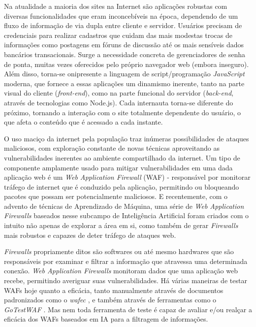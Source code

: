 Na atualidade a maioria dos sites na Internet são aplicações robustas com diversas funcionalidades que eram inconcebíveis na época, dependendo de um fluxo de informação de via dupla entre cliente e servidor. Usuários precisam de credenciais para realizar cadastros que cuidam das mais modestas trocas de informações como postagens em fóruns de discussão até os mais sensíveis dados bancários transacionais. Surge a necessidade concreta de gerenciadores de senha de ponta, muitas vezes oferecidos pelo próprio navegador web (embora inseguro). Além disso, torna-se onipresente a linguagem de script/programação \textit{JavaScript} moderna, que fornece a essas aplicações um dinamismo inerente, tanto na parte visual do cliente (\textit{front-end}), como na parte funcional do servidor (\textit{back-end}, através de tecnologias como Node.js). Cada internauta torna-se diferente do próximo, tornando a interação com o site totalmente dependente do usuário, o que afeta o conteúdo que é acessado a cada instante.

O uso maciço da internet pela população traz inúmeras possibilidades de ataques maliciosos, com exploração constante de novas técnicas aproveitando as vulnerabilidades inerentes ao ambiente compartilhado da internet. Um tipo de componente amplamente usado para mitigar vulnerabilidades em uma dada aplicação web é um \textit{Web Application Firewall} (WAF) - responsável por monitorar tráfego de internet que é conduzido pela aplicação, permitindo ou bloqueando pacotes que possam ser potencialmente maliciosos. E recentemente, com o advento de técnicas de Aprendizado de Máquina, uma série de \textit{Web Application Firewalls} baseados nesse subcampo de Inteligência Artificial foram criados com o intuito não apenas de explorar a área em si, como também de gerar \textit{Firewalls} mais robustos e capazes de deter tráfego de ataques web. 

\textit{Firewalls} propriamente ditos são softwares ou até mesmo hardwares que são responsáveis por examinar e filtrar a informação que atravessa uma determinada conexão. \textit{Web Application Firewalls} monitoram dados que uma aplicação web recebe, permitindo averiguar suas vulnerabilidades. Há várias maneiras de testar WAFs hoje quanto a eficácia, tanto manualmente através de documentos padronizados como o \textit{wafec} \cite{wafec_doc}, e também através de ferramentas como o \textit{GoTestWAF} \cite{gotestwaf_wallarm}. Mas nem toda ferramenta de teste é capaz de avaliar e/ou realçar a eficácia dos WAFs baseados em IA para a filtragem de informações.

